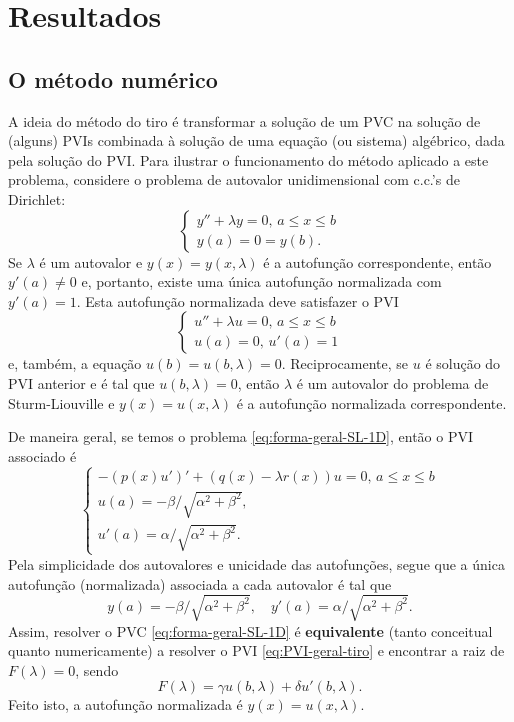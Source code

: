 \documentclass[twocolumn,showpacs,%
  nofootinbib,aps,superscriptaddress,%
  eqsecnum,prd,notitlepage,showkeys,10pt]{revtex4-1}
\renewcommand{\leq}{\leqslant}
\begin{document}
\section{Resultados}
\label{sec:resultados}
%
\subsection{O método numérico}
%
A ideia do método do tiro é transformar a solução de um PVC na solução
de (alguns) PVIs combinada à solução de uma equação (ou sistema) algébrico,
dada pela solução do PVI.
Para ilustrar o funcionamento do método aplicado a este problema, considere
o problema de autovalor unidimensional com c.c.'s de Dirichlet:
%
\[
    \left\{
    \begin{array}{l}
        y'' + \lambda y = 0, \, a \leq x \leq b \\ 
        y(a) = 0 = y(b).
    \end{array}
    \right.
\]
%
Se $\lambda$ é um autovalor e $y(x) = y(x,\lambda)$ é a autofunção correspondente,
então $y'(a) \neq 0$ e, portanto, existe uma única autofunção normalizada com $y'(a) = 1$.
Esta autofunção normalizada deve satisfazer o PVI
%
\[
    \left\{
    \begin{array}{l}
        u'' + \lambda u = 0, \, a \leq x \leq b \\ 
        u(a) = 0, \, u'(a) = 1
    \end{array}
    \right.
\]
%
e, também, a equação $u(b) = u(b,\lambda) = 0$. Reciprocamente, se $u$ é solução
do PVI anterior e é tal que $u(b,\lambda) = 0$, então $\lambda$ é um autovalor
do problema de Sturm-Liouville e $y(x) = u(x,\lambda)$ é a autofunção normalizada correspondente.

De maneira geral, se temos o problema \eqref{eq:forma-geral-SL-1D}, então o PVI associado é
%
\begin{equation}
\label{eq:PVI-geral-tiro}
    \left\{
        \begin{array}{l}
            -(p(x)u')' + (q(x) - \lambda r(x))u = 0, \, a \leq x \leq b \\ 
            u(a) = -\beta/\sqrt{\alpha^2 + \beta^2}, \\ 
            u'(a) = \alpha/\sqrt{\alpha^2 + \beta^2}.
        \end{array}
    \right.
\end{equation}
%
Pela simplicidade dos autovalores e unicidade das autofunções,
segue que a única autofunção (normalizada) associada a cada autovalor é tal que
%
\[
    y(a) = -\beta/\sqrt{\alpha^2 + \beta^2}, \quad
    y'(a) = \alpha/\sqrt{\alpha^2 + \beta^2}.
\]
%
Assim, resolver o  PVC \eqref{eq:forma-geral-SL-1D}
é \textbf{equivalente} (tanto conceitual quanto numericamente)
a resolver o PVI \eqref{eq:PVI-geral-tiro}
e encontrar a raiz de $F(\lambda) = 0$, sendo
%
\begin{equation}
\label{eq:eq-algebrica-tiro}
    F(\lambda) = \gamma u(b, \lambda) + \delta u'(b, \lambda).
\end{equation}
%
Feito isto, a autofunção normalizada é $y(x) = u(x,\lambda)$.
\end{document}
